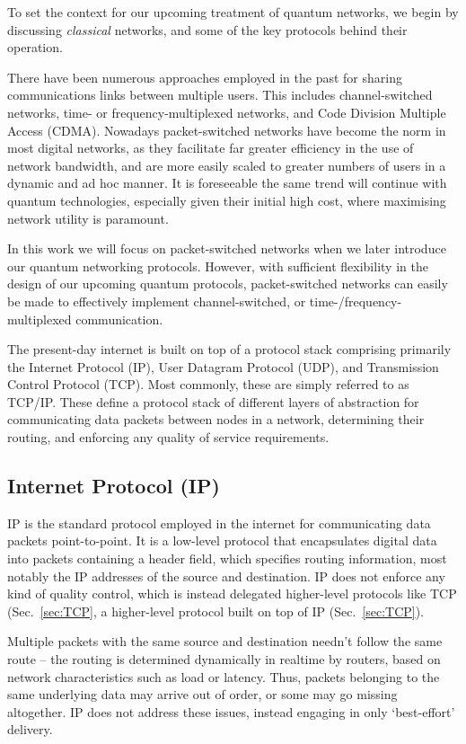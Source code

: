 \documentclass[aps,rmp,twocolumn,amsmath,amssymb,nofootinbib,superscriptaddress,longbibliography,floatfix]{revtex4-1}
\begin{document}
To set the context for our upcoming treatment of quantum networks, we begin by discussing \emph{classical} networks, and some of the key protocols behind their operation.

There have been numerous approaches employed in the past for sharing communications links between multiple users. This includes channel-switched networks, time- or frequency-multiplexed networks, and Code Division Multiple Access (CDMA). Nowadays packet-switched networks have become the norm in most digital networks, as they facilitate far greater efficiency in the use of network bandwidth, and are more easily scaled to greater numbers of users in a dynamic and ad hoc manner. It is foreseeable the same trend will continue with quantum technologies, especially given their initial high cost, where maximising network utility is paramount.

In this work we will focus on packet-switched networks when we later introduce our quantum networking protocols. However, with sufficient flexibility in the design of our upcoming quantum protocols, packet-switched networks can easily be made to effectively implement channel-switched, or time-/frequency-multiplexed communication.

The present-day internet is built on top of a protocol stack comprising primarily the Internet Protocol (IP), User Datagram Protocol (UDP), and Transmission Control Protocol (TCP). Most commonly, these are simply referred to as TCP/IP. These define a protocol stack of different layers of abstraction for communicating data packets between nodes in a network, determining their routing, and enforcing any quality of service requirements.

%
%

\subsection{Internet Protocol (IP)}

IP is the standard protocol employed in the internet for communicating data packets point-to-point. It is a low-level protocol that encapsulates digital data into packets containing a header field, which specifies routing information, most notably the IP addresses of the source and destination. IP does not enforce any kind of quality control, which is instead delegated higher-level protocols like TCP (Sec.~\ref{sec:TCP}, a higher-level protocol built on top of IP (Sec.~\ref{sec:TCP}).

Multiple packets with the same source and destination needn't follow the same route -- the routing is determined dynamically in realtime by routers, based on network characteristics such as load or latency. Thus, packets belonging to the same underlying data may arrive out of order, or some may go missing altogether. IP does not address these issues, instead engaging in only `best-effort' delivery. 
\end{document}
